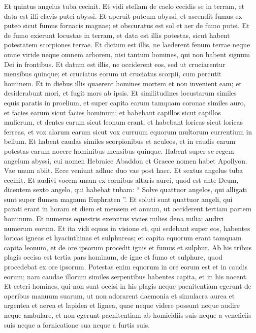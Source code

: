 \begin{biblechapter}
\begin{biblechapter}
\begin{biblechapter}
\begin{biblechapter}
\begin{biblechapter}
\begin{biblechapter}
\begin{biblechapter}
\begin{biblechapter}
\begin{biblechapter}
\verse Et quintus angelus tuba cecinit. Et vidi stellam de caelo cecidis se in terram, et data est illi clavis putei abyssi. 
\verse Et aperuit puteum abyssi, et ascendit fumus ex puteo sicut fumus fornacis magnae; et obscuratus est sol et aer de fumo putei. 
\verse Et de fumo exierunt locustae in terram, et data est illis potestas, sicut habent potestatem scorpiones terrae. 
\verse Et dictum est illis, ne laederent fenum terrae neque omne viride neque omnem arborem, nisi tantum homines, qui non habent signum Dei in frontibus. 
\verse Et datum est illis, ne occiderent eos, sed ut cruciarentur mensibus quinque; et cruciatus eorum ut cruciatus scorpii, cum percutit hominem. 
\verse Et in diebus illis quaerent homines mortem et non invenient eam; et desiderabunt mori, et fugit mors ab ipsis.
 \verse Et similitudines locustarum similes equis paratis in proelium, et super capita earum tamquam coronae similes auro, et facies earum sicut facies hominum; 
\verse et habebant capillos sicut capillos mulierum, et dentes earum sicut leonum erant, 
\verse et habebant loricas sicut loricas ferreas, et vox alarum earum sicut vox curruum equorum multorum currentium in bellum. 
\verse Et habent caudas similes scorpionibus et aculeos, et in caudis earum potestas earum nocere hominibus mensibus quinque. 
\verse Habent super se regem angelum abyssi, cui nomen Hebraice Abaddon et Graece nomen habet Apollyon.
 \verse Vae unum abiit. Ecce veniunt adhuc duo vae post haec.
 \verse Et sextus angelus tuba cecinit. Et audivi vocem unam ex cornibus altaris aurei, quod est ante Deum, 
\verse dicentem sexto angelo, qui habebat tubam: “ Solve quattuor angelos, qui alligati sunt super flumen magnum Euphraten ”. 
 \verse Et soluti sunt quattuor angeli, qui parati erant in horam et diem et mensem et annum, ut occiderent tertiam partem hominum. 
\verse Et numerus equestris exercitus vicies milies dena milia; audivi numerum eorum. 
\verse Et ita vidi equos in visione et, qui sedebant super eos, habentes loricas igneas et hyacinthinas et sulphureas; et capita equorum erant tamquam capita leonum, et de ore ipsorum procedit ignis et fumus et sulphur. 
\verse Ab his tribus plagis occisa est tertia pars hominum, de igne et fumo et sulphure, quod procedebat ex ore ipsorum. 
\verse Potestas enim equorum in ore eorum est et in caudis eorum; nam caudae illorum similes serpentibus habentes capita, et in his nocent.
 \verse Et ceteri homines, qui non sunt occisi in his plagis neque paenitentiam egerunt de operibus manuum suarum, ut non adorarent daemonia et simulacra aurea et argentea et aerea et lapidea et lignea, quae neque videre possunt neque audire neque ambulare, 
\verse et non egerunt paenitentiam ab homicidiis suis neque a veneficiis suis neque a fornicatione sua neque a furtis suis.
 

\end{biblechapter}
\end{biblechapter}
\end{biblechapter}
\end{biblechapter}
\end{biblechapter}
\end{biblechapter}
\end{biblechapter}
\end{biblechapter}
\end{biblechapter}
